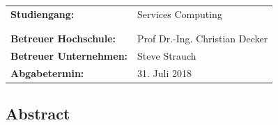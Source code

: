 \documentclass[paper=a4,       %
					 11pt,
					 BCOR0mm,  %
					 DIV10,    %
					 automark, %
					 twoside,
					 halfparskip,
					 bibtotoc,
					 headsepline,
					 normalheadings,
					 appendixprefix,
					 pagesize  %
 ]{scrbook}
\begin{document}
\begin{titlepage}
\begin{sffamily}
\begin{center}
\begin{minipage}{3cm}
\begin{center}
\end{center}
\end{minipage}
\begin{minipage}{3cm}
\begin{center}
\end{center}
\end{minipage}
\end{center}
%
\vspace{1.0cm}
%
\begin{center}
\begin{tabular}{ll}
\textbf{Studiengang:} & Services Computing\\
&\\&\\
\textbf{Betreuer Hochschule:}   & Prof Dr.-Ing. Christian Decker\\
\textbf{Betreuer Unternehmen:}   & Steve Strauch\\
                     
\textbf{Abgabetermin:} &   31. Juli 2018\\

\end{tabular}
\end{center}
\end{sffamily}
\end{titlepage}
\restoregeometry
\cleardoubleemptypage

\setlength{\parindent}{0.0em}


\begin{center}
\section*{Abstract}
\end{center}
\pagestyle{empty}
\end{document}
